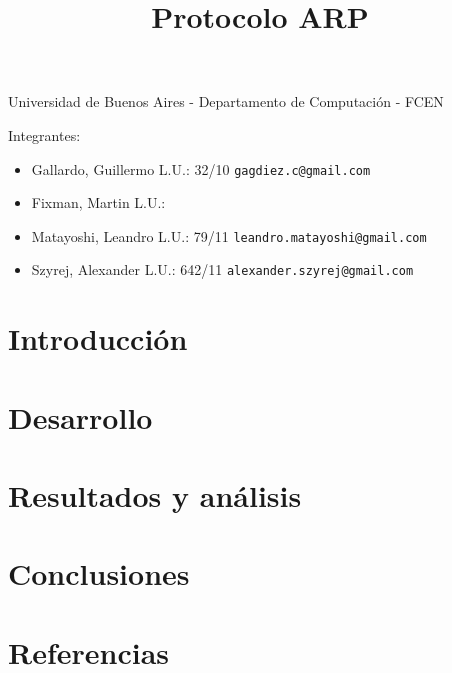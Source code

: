 \documentclass[a4paper,11pt]{article}
\title{Protocolo ARP}
\begin{document}
\maketitle

\begin{center}
	Universidad de Buenos Aires - Departamento de Computaci\'on - FCEN
\end{center}

\vspace{2cm}
Integrantes:

\begin{itemize}
	\item Gallardo, Guillermo L.U.: 32/10 \verb+gagdiez.c@gmail.com+
	\item Fixman, Martin L.U.:
	\item Matayoshi, Leandro L.U.: 79/11 \verb+leandro.matayoshi@gmail.com+
	\item Szyrej, Alexander L.U.: 642/11 \verb+alexander.szyrej@gmail.com+
		
\end{itemize}

\newpage

\tableofcontents

\newpage

\section{Introducción}



\section{Desarrollo}



\section{Resultados y análisis}

\section{Conclusiones}

\section{Referencias}
\end{document}
